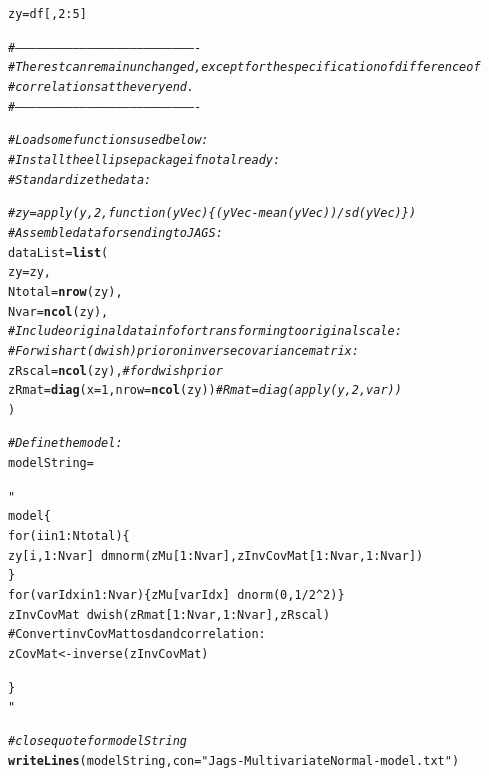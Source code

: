 \documentclass[11pt,a4paper,twoside]{book}\usepackage[]{graphicx}\usepackage[]{color}
\makeatletter
\newcommand{\hlnum}[1]{\textcolor[rgb]{0.686,0.059,0.569}{#1}}%
\newcommand{\hlstr}[1]{\textcolor[rgb]{0.192,0.494,0.8}{#1}}%
\newcommand{\hlcom}[1]{\textcolor[rgb]{0.678,0.584,0.686}{\textit{#1}}}%
\newcommand{\hlopt}[1]{\textcolor[rgb]{0,0,0}{#1}}%
\newcommand{\hlstd}[1]{\textcolor[rgb]{0.345,0.345,0.345}{#1}}%
\newcommand{\hlkwb}[1]{\textcolor[rgb]{0.69,0.353,0.396}{#1}}%
\newcommand{\hlkwc}[1]{\textcolor[rgb]{0.333,0.667,0.333}{#1}}%
\newcommand{\hlkwd}[1]{\textcolor[rgb]{0.737,0.353,0.396}{\textbf{#1}}}%
\newenvironment{kframe}{%
 \def\at@end@of@kframe{}%
 \ifinner\ifhmode%
  \def\at@end@of@kframe{\end{minipage}}%
  \begin{minipage}{\columnwidth}%
 \fi\fi%
 \def\FrameCommand##1{\hskip\@totalleftmargin \hskip-\fboxsep
 \colorbox{shadecolor}{##1}\hskip-\fboxsep
     \hskip-\linewidth \hskip-\@totalleftmargin \hskip\columnwidth}%
 \MakeFramed {\advance\hsize-\width
   \@totalleftmargin\z@ \linewidth\hsize
   \@setminipage}}%
 {\par\unskip\endMakeFramed%
 \at@end@of@kframe}
\newenvironment{knitrout}{}{} %
\makeatother
\begin{document}
\begin{knitrout}
\color{fgcolor}\begin{kframe}
\begin{alltt}
\hlstd{zy} \hlkwb{=} \hlstd{df[,}\hlnum{2}\hlopt{:}\hlnum{5}\hlstd{]}

\hlcom{#----------------------------------------------------------------------------}
\hlcom{# The rest can remain unchanged, except for the specification of difference of}
\hlcom{# correlations at the very end.}
\hlcom{#----------------------------------------------------------------------------}

\hlcom{# Load some functions used below:}
\hlcom{# Install the ellipse package if not already:}
\hlcom{# Standardize the data:}

\hlcom{#zy = apply(y,2,function(yVec)\{(yVec-mean(yVec))/sd(yVec)\})}
\hlcom{# Assemble data for sending to JAGS:}
\hlstd{dataList} \hlkwb{=} \hlkwd{list}\hlstd{(}
        \hlkwc{zy} \hlstd{= zy ,}
        \hlkwc{Ntotal} \hlstd{=}  \hlkwd{nrow}\hlstd{(zy) ,}
        \hlkwc{Nvar} \hlstd{=} \hlkwd{ncol}\hlstd{(zy) ,}
        \hlcom{# Include original data info for transforming to original scale:}
        \hlcom{# For wishart (dwish) prior on inverse covariance matrix:}
        \hlkwc{zRscal} \hlstd{=} \hlkwd{ncol}\hlstd{(zy) ,}  \hlcom{# for dwish prior}
        \hlkwc{zRmat} \hlstd{=} \hlkwd{diag}\hlstd{(}\hlkwc{x}\hlstd{=}\hlnum{1}\hlstd{,}\hlkwc{nrow}\hlstd{=}\hlkwd{ncol}\hlstd{(zy))}  \hlcom{# Rmat = diag(apply(y,2,var))}
\hlstd{)}

\hlcom{# Define the model:}
\hlstd{modelString} \hlkwb{=} \hlstr{"
model \{
for ( i in 1:Ntotal ) \{
zy[i,1:Nvar] ~ dmnorm( zMu[1:Nvar] , zInvCovMat[1:Nvar,1:Nvar] ) 
\}
for ( varIdx in 1:Nvar ) \{ zMu[varIdx] ~ dnorm( 0 , 1/2^2 ) \}
zInvCovMat ~ dwish( zRmat[1:Nvar,1:Nvar] , zRscal )
# Convert invCovMat to sd and correlation:
zCovMat <- inverse( zInvCovMat )

\}
"} \hlcom{# close quote for modelString}
\hlkwd{writeLines}\hlstd{( modelString ,} \hlkwc{con}\hlstd{=}\hlstr{"Jags-MultivariateNormal-model.txt"} \hlstd{)}


\end{alltt}
\end{kframe}
\end{knitrout}
\end{document}
